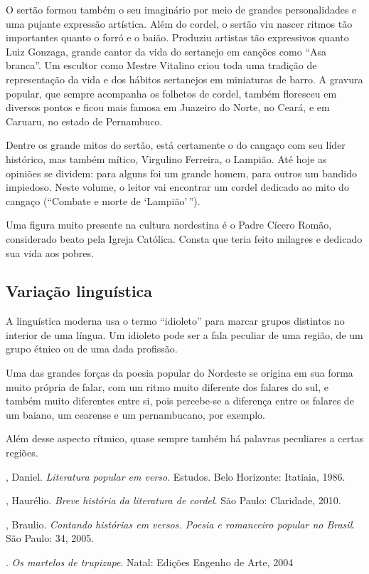 O sertão formou também o seu imaginário por meio de grandes
personalidades e uma pujante expressão artística. Além do cordel, o
sertão viu nascer ritmos tão importantes quanto o forró e o baião.
Produziu artistas tão expressivos quanto Luiz Gonzaga, grande cantor da
vida do sertanejo em canções como ``Asa
branca''. Um escultor como Mestre Vitalino criou toda
uma tradição de representação da vida e dos hábitos sertanejos em
miniaturas de barro. A gravura popular, que sempre acompanha os
folhetos de cordel, também floresceu em diversos pontos e ficou mais
famosa em Juazeiro do Norte, no Ceará, e em Caruaru, no estado de
Pernambuco. 

Dentre os grande mitos do sertão, está certamente o do cangaço com seu
líder histórico, mas também mítico, Virgulino Ferreira, o Lampião. Até
hoje as opiniões se dividem: para alguns foi um grande homem, para
outros um bandido impiedoso. Neste volume, o leitor vai encontrar 
um cordel dedicado ao mito do cangaço (``Combate e morte de `Lampião'\,''). 

Uma figura muito presente na cultura nordestina é o Padre Cícero Romão,
considerado beato pela Igreja Católica. Consta que teria feito milagres
e dedicado sua vida aos pobres. 

\subsection{Variação linguística}

A linguística moderna usa o termo
``idioleto'' para marcar grupos
distintos no interior de uma língua. Um idioleto pode ser a fala
peculiar de uma região, de um grupo étnico ou de uma dada profissão. 

Uma das grandes forças da poesia popular do Nordeste se origina em sua
forma muito própria de falar, com um ritmo muito diferente dos falares
do sul, e também muito diferentes entre si, pois percebe-se a diferença
entre os falares de um baiano, um cearense e um pernambucano, por
exemplo.

Além desse aspecto rítmico, quase sempre também há palavras peculiares a
certas regiões. 


\begin{bibliohedra}

, Daniel. \textit{Literatura popular em verso}. Estudos. Belo Horizonte: Itatiaia, 1986. 

, Haurélio. \textit{Breve história da literatura de cordel}. São Paulo: Claridade, 2010.

, Braulio. \textit{Contando histórias em versos. Poesia e romanceiro popular 
no Brasil}. São Paulo: 34, 2005.

\titidem. \textit{Os martelos de trupizupe}. Natal: Edições Engenho de Arte, 2004


\end{bibliohedra}